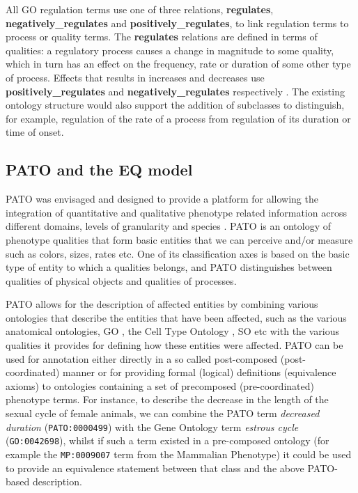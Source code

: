 \documentclass{bioinfo}
\renewcommand{\cite}{\citep}
\begin{document}
\begin{methods}
All GO regulation terms use one of three relations, {\bf regulates},
{\bf negatively\_regulates} and {\bf positively\_regulates}, to link
regulation terms to process or quality terms. The {\bf regulates}
relations are defined in terms of qualities: a regulatory process
causes a change in magnitude to some quality, which in turn has an
effect on the frequency, rate or duration of some other type of
process. Effects that results in increases and decreases use {\bf
  positively\_regulates} and {\bf negatively\_regulates} respectively
\cite{Mungall2010go}. The existing ontology structure would also
support the addition of subclasses to distinguish, for example,
regulation of the rate of a process from regulation of its duration or
time of onset.

\subsection{PATO and the EQ model}
PATO was envisaged and designed to provide a platform for allowing the
integration of quantitative and qualitative phenotype related
information across different domains, levels of granularity and
species \cite{Gkoutos2005}.  PATO is an ontology of phenotype
qualities that form basic entities that we can perceive and/or measure
such as colors, sizes, rates etc. One of its classification axes is
based on the basic type of entity to which a qualities belongs, and
PATO distinguishes between qualities of physical objects and qualities
of processes.

PATO allows for the description of affected entities by combining
various ontologies that describe the entities that have been affected,
such as the various anatomical ontologies, GO \cite {Ashburner2000b},
the Cell Type Ontology \cite {Bard2005}, SO \cite {Eilbeck2005} etc
with the various qualities it provides for defining how these entities
were affected.  PATO can be used for annotation either directly in a
so called post-composed (post-coordinated) manner or for providing
formal (logical) definitions (equivalence axioms) to ontologies
containing a set of precomposed (pre-coordinated) phenotype terms. For
instance, to describe the decrease in the length of the sexual cycle
of female animals, we can combine the PATO term \textit{decreased
  duration} ({\tt PATO:0000499}) with the Gene Ontology term
\textit{estrous cycle} ({\tt GO:0042698}), whilst if such a term
existed in a pre-composed ontology (for example the {\tt MP:0009007}
term from the Mammalian Phenotype) it could be used to provide an
equivalence statement between that class and the above PATO-based
description.
\end{methods}
\end{document}
